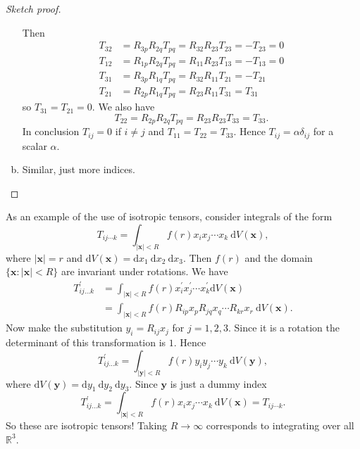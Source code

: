 \begin{proof}[Sketch proof]
\begin{enumerate}[(a)]
\[        \]
        Then
        \begin{align*}
            T_{32}&=R_{3 p} R_{2 q} T_{p q}=R_{32} R_{23} T_{23}=-T_{23}=0 \\
        T_{12}&=R_{1 p} R_{2 q} T_{p q}=R_{11} R_{23} T_{13}=-T_{13}=0 \\
        T_{31}&=R_{3 p} R_{1 q} T_{p q}=R_{32} R_{11} T_{21}=-T_{21} \\
        T_{21}&=R_{2 p} R_{1 q} T_{p q}=R_{23} R_{11} T_{31}=T_{31}
        \end{align*}
        so $T_{31}=T_{21}=0 .$ We also have
        \[
        T_{22}=R_{2 p} R_{2 q} T_{p q}=R_{23} R_{23} T_{33}=T_{33}.
        \]
        In conclusion $T_{i j}=0$ if $i \neq j$ and $T_{11}=T_{22}=T_{33}$. Hence $T_{i j}=\alpha \delta_{i j}$ for a scalar $\alpha$.
        \item Similar, just more indices.

    \end{enumerate}
\end{proof}

As an example of the use of isotropic tensors, consider integrals of the form
\[
T_{i j \cdots k}=\int_{|\mathbf{x}|<R} f(r) x_{i} x_{j} \cdots x_{k} \mathrm{~d} V(\mathbf{x}),
\]
where $|\mathbf{x}|=r$ and $\mathrm{d} V(\mathbf{x})=\mathrm{d} x_{1} \mathrm{~d} x_{2} \mathrm{~d} x_{3} .$ Then $f(r)$ and the domain $\{\mathbf{x}:|\mathbf{x}|<R\}$ are
invariant under rotations. We have
\[
\begin{aligned}
T_{i j \ldots k}^{\prime} &=\int_{|\mathbf{x}|<R} f(r) x_{i}^{\prime} x_{j}^{\prime} \cdots x_{k}^{\prime} \mathrm{d} V(\mathbf{x}) \\
&=\int_{|\mathbf{x}|<R} f(r) R_{i p} x_{p} R_{j q} x_{q} \cdots R_{k r} x_{r} \mathrm{~d} V(\mathbf{x}).
\end{aligned}
\]
Now make the substitution $y_{i}=R_{i j} x_{j}$ for $j=1,2,3$. Since it is a rotation the determinant of this transformation is $1 .$ Hence
\[
T_{i j \ldots k}^{\prime}=\int_{|\mathbf{y}|<R} f(r) y_{i} y_{j} \cdots y_{k} \mathrm{~d} V(\mathbf{y}),
\]
where $\mathrm{d} V(\mathbf{y})=\mathrm{d} y_{1} \mathrm{~d} y_{2} \mathrm{~d} y_{3} .$ Since $\mathbf{y}$ is just a dummy index
\[
T_{i j \ldots k}^{\prime}=\int_{|\mathbf{x}|<R} f(r) x_{i} x_{j} \cdots x_{k} \mathrm{~d} V(\mathbf{x})=T_{i j \cdots k}.
\]
So these are isotropic tensors! Taking $R \rightarrow \infty$ corresponds to integrating over all $\mathbb{R}^{3}$.

